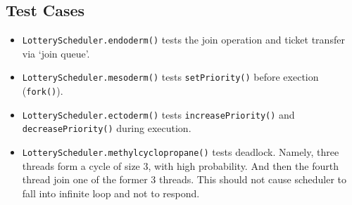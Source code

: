 \documentclass{article}
\begin{document}
\subsection{Test Cases}

\begin{itemize}
\item
\texttt{LotteryScheduler.endoderm()} tests the join operation and ticket transfer via `join queue'.
\item
\texttt{LotteryScheduler.mesoderm()} tests \texttt{setPriority()} before exection (\texttt{fork()}).
\item
\texttt{LotteryScheduler.ectoderm()} tests \texttt{increasePriority()} and \texttt{decreasePriority()} during execution.
\item
\texttt{LotteryScheduler.methylcyclopropane()} tests deadlock.
Namely, three threads form a cycle of size 3, with high probability.
And then the fourth thread join one of the former 3 threads.
This should not cause scheduler to fall into infinite loop and not to respond.
\end{itemize}

\label{LastPage}
\end{document}
